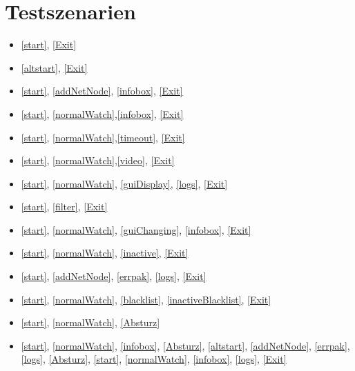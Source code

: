 \section{Testszenarien}

\begin{itemize}
  \item \ref{start}, \ref{Exit}
  \item \ref{altstart}, \ref{Exit}
  \item \ref{start}, \ref{addNetNode}, \ref{infobox}, \ref{Exit}
  \item \ref{start}, \ref{normalWatch},\ref{infobox}, \ref{Exit}
  \item \ref{start}, \ref{normalWatch},\ref{timeout}, \ref{Exit}
  \item \ref{start}, \ref{normalWatch},\ref{video}, \ref{Exit}
  \item \ref{start}, \ref{normalWatch}, \ref{guiDisplay}, \ref{logs}, \ref{Exit}
  \item \ref{start}, \ref{filter}, \ref{Exit}
  \item \ref{start}, \ref{normalWatch}, \ref{guiChanging}, \ref{infobox}, \ref{Exit}
  \item \ref{start}, \ref{normalWatch}, \ref{inactive}, \ref{Exit}
  \item \ref{start}, \ref{addNetNode}, \ref{errpak}, \ref{logs}, \ref{Exit}
  \item \ref{start}, \ref{normalWatch}, \ref{blacklist}, \ref{inactiveBlacklist}, \ref{Exit}
  \item \ref{start}, \ref{normalWatch}, \ref{Absturz}
  \item \ref{start}, \ref{normalWatch}, \ref{infobox}, \ref{Absturz}, \ref{altstart}, \ref{addNetNode}, \ref{errpak}, \ref{logs}, \ref{Absturz}, \ref{start}, \ref{normalWatch}, \ref{infobox}, \ref{logs}, \ref{Exit}
\end{itemize}
